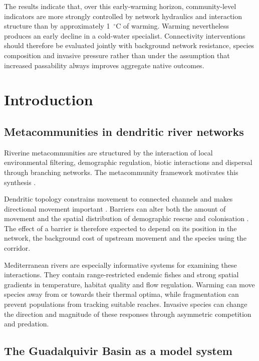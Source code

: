 \documentclass[11pt,a4paper]{article}
\begin{document}
The results indicate that, over this early-warming horizon, community-level indicators are more strongly controlled by network hydraulics and interaction structure than by approximately 1~$^\circ$C of warming. Warming nevertheless produces an early decline in a cold-water specialist. Connectivity interventions should therefore be evaluated jointly with background network resistance, species composition and invasive pressure rather than under the assumption that increased passability always improves aggregate native outcomes.

\section{Introduction}

\subsection{Metacommunities in dendritic river networks}

Riverine metacommunities are structured by the interaction of local environmental filtering, demographic regulation, biotic interactions and dispersal through branching networks. The metacommunity framework motivates this synthesis \cite{leibold2004metacommunity}.

Dendritic topology constrains movement to connected channels and makes directional movement important \cite{altermatt2013dendritic}. Barriers can alter both the amount of movement and the spatial distribution of demographic rescue and colonisation \cite{PerkinGido2012}. The effect of a barrier is therefore expected to depend on its position in the network, the background cost of upstream movement and the species using the corridor.

Mediterranean rivers are especially informative systems for examining these interactions. They contain range-restricted endemic fishes and strong spatial gradients in temperature, habitat quality and flow regulation. Warming can move species away from or towards their thermal optima, while fragmentation can prevent populations from tracking suitable reaches. Invasive species can change the direction and magnitude of these responses through asymmetric competition and predation.

\subsection{The Guadalquivir Basin as a model system}
\end{document}
